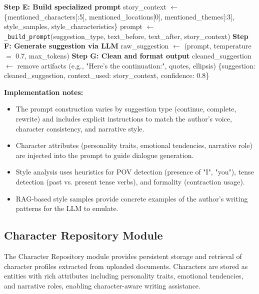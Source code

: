 \begin{algorithm}[H]
\begin{algorithmic}[1]
\State \textbf{Step E: Build specialized prompt}
\State story\_context $\leftarrow$ \{mentioned\_characters[:5], mentioned\_locations[0],
\Statex \hspace{2em} mentioned\_themes[:3], style\_samples, style\_characteristics\}
\State prompt $\leftarrow$ \texttt{\_build\_prompt}(suggestion\_type, text\_before, text\_after, story\_context)
\State \textbf{Step F: Generate suggestion via LLM}
\State raw\_suggestion $\leftarrow$ \texttt{}(prompt, temperature $=$ 0.7, max\_tokens)
\State \textbf{Step G: Clean and format output}
\State cleaned\_suggestion $\leftarrow$ remove artifacts (e.g., "Here's the continuation:", quotes, ellipsis)
\State \Return \{suggestion: cleaned\_suggestion, context\_used: story\_context, confidence: 0.8\}
\end{algorithmic}\normalsize
\end{algorithm}
\FloatBarrier

\textbf{Implementation notes:}
\begin{itemize}
    \item The prompt construction varies by suggestion type (continue, complete, rewrite) and includes explicit instructions to match the author's voice, character consistency, and narrative style.
    \item Character attributes (personality traits, emotional tendencies, narrative role) are injected into the prompt to guide dialogue generation.
    \item Style analysis uses heuristics for POV detection (presence of "I", "you"), tense detection (past vs. present tense verbs), and formality (contraction usage).
    \item RAG-based style samples provide concrete examples of the author's writing patterns for the LLM to emulate.
\end{itemize}

\subsection{Character Repository Module}
\label{subsec:character-repository}

The Character Repository module provides persistent storage and retrieval of character profiles extracted from uploaded documents. Characters are stored as entities with rich attributes including personality traits, emotional tendencies, and narrative roles, enabling character-aware writing assistance.

